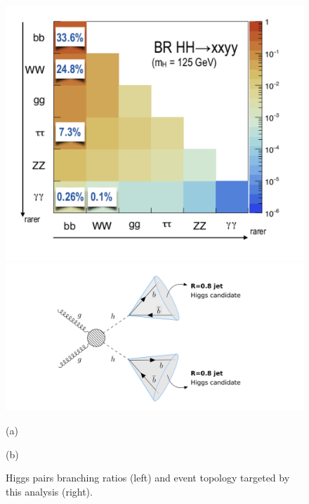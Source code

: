 \begin{figure}
	\centering
	\begin{minipage}{.45\textwidth}
		\centering
		\includegraphics[width=\linewidth]{./Figures/hhBR.png}
	\end{minipage}%
	\begin{minipage}{.55\textwidth}
		\centering
		\includegraphics[trim={4cm 0 5cm 0},clip,width=\linewidth]{./Figures/boosted1.png}
	\end{minipage}
	\begin{minipage}[t]{0.45\textwidth}
		\caption*{(a)}
	\end{minipage}%
	\hfill
	\begin{minipage}[t]{0.55\textwidth}
		\caption*{(b)}
	\end{minipage}
	\caption{Higgs pairs branching ratios (left) and event topology targeted by this analysis (right).}
	\label{fig:boosted}
\end{figure}

